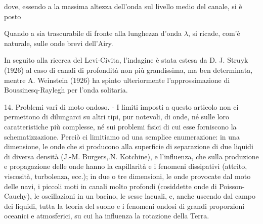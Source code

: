\documentclass[a4paper]{article}
\begin{document}
dove, essendo a la massima altezza dell'onda sul livello medio del canale, si è posto

Quando a sia trascurabile di fronte alla lunghezza d'onda $\lambda$, si ricade, com'è naturale, sulle onde brevi dell'Airy.

In seguito alla ricerca del Levi-Civita, l'indagine è stata estesa da D. J. Struyk (1926) al caso di canali di profondità non più grandissima, ma ben determinata, mentre A. Weinstein (1926) ha spinto ulteriormente l'approssimazione di Boussinesq-Raylegh per l'onda solitaria.

14. Problemi varî di moto ondoso. - I limiti imposti a questo articolo non ci permettono di dilungarci su altri tipi, pur notevoli, di onde, né sulle loro caratteristiche più complesse, né sui problemi fisici di cui esse forniscono la schematizzazione. Perciò ci limitiamo ad una semplice enumerazione: in una dimensione, le onde che si producono alla superficie di separazione di due liquidi di diversa densità (J.-M. Burgers,.N. Kotchine), e l'influenza, che sulla produzione e propagazione delle onde hanno la capillarità e i fenomeni dissipativi (attrito, viscosità, turbolenza, ecc.); in due o tre dimensioni, le onde provocate dal moto delle navi, i piccoli moti in canali molto profondi (cosiddette onde di Poisson-Cauchy), le oscillazioni in un bacino, le sesse lacuali, e, anche uscendo dal campo dei liquidi, tutta la teoria del suono e i fenomeni ondosi di grandi proporzioni oceanici e atmosferici, su cui ha influenza la rotazione della Terra.
\end{document}
